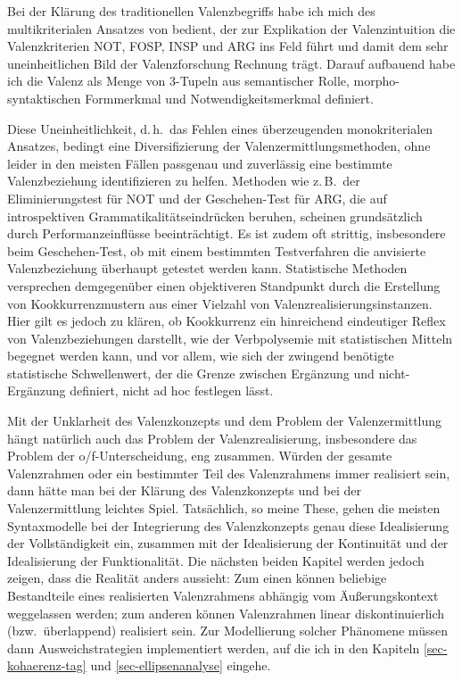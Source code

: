 Bei der Klärung des traditionellen Valenzbegriffs habe ich mich des multikriterialen Ansatzes von \cite{Jacobs:94} bedient, der zur Explikation der Valenzintuition die Valenzkriterien NOT, FOSP, INSP und ARG ins Feld führt und damit dem sehr uneinheitlichen Bild der Valenzforschung Rechnung trägt. Darauf aufbauend habe ich die Valenz als Menge von 3-Tupeln aus semantischer Rolle, morpho-syntaktischen Formmerkmal und Notwendigkeitsmerkmal definiert.  

Diese Uneinheitlichkeit, d.\,h.\ das Fehlen eines überzeugenden monokriterialen Ansatzes, bedingt eine Diversifizierung der Valenzermittlungsmethoden, ohne leider in den meisten Fällen passgenau und zuverlässig eine bestimmte Valenzbeziehung identifizieren zu helfen. Methoden wie z.\,B.\ der Eliminierungstest für NOT und der Geschehen-Test für ARG, die auf introspektiven Grammatikalitätseindrücken beruhen, scheinen grundsätzlich durch Performanzeinflüsse beeinträchtigt. Es ist zudem oft strittig, insbesondere beim Geschehen-Test, ob mit einem bestimmten Testverfahren die anvisierte Valenzbeziehung überhaupt getestet werden kann. Statistische Methoden  versprechen demgegenüber einen objektiveren Standpunkt durch die Erstellung von Kookkurrenzmustern aus einer Vielzahl von Valenzrealisierungsinstanzen. Hier gilt es jedoch zu klären, ob Kookkurrenz ein hinreichend eindeutiger Reflex von Valenzbeziehungen darstellt, wie der Verbpolysemie mit statistischen Mitteln begegnet werden kann, und vor allem, wie sich der zwingend benötigte statistische Schwellenwert, der die Grenze zwischen Ergänzung und nicht-Ergänzung definiert, nicht ad hoc festlegen lässt.

Mit der Unklarheit des Valenzkonzepts und dem Problem der Valenzermittlung hängt natürlich auch das Problem der Valenzrealisierung, insbesondere das Problem der o/f-Unterschei\-dung, eng zusammen. Würden der gesamte Valenzrahmen oder ein bestimmter Teil des Valenzrahmens immer realisiert sein, dann hätte man bei der Klärung des Valenzkonzepts und bei der Valenzermittlung leichtes Spiel. Tatsächlich, so meine These, gehen die meisten Syntaxmodelle bei der Integrierung des Valenzkonzepts genau diese Idealisierung der Vollständigkeit ein, zusammen mit der Idealisierung der Kontinuität und der Idealisierung der Funktionalität. Die nächsten beiden Kapitel werden jedoch zeigen, dass die Realität anders aussieht: Zum einen können beliebige Bestandteile eines realisierten Valenzrahmens abhängig vom Äu\ss erungskontext weggelassen werden; zum anderen können Valenzrahmen linear diskontinuierlich (bzw.\ überlappend) realisiert sein. Zur Modellierung solcher Phänomene müssen dann Ausweichstrategien implementiert werden, auf die ich in den Kapiteln \ref{sec-kohaerenz-tag} und \ref{sec-ellipsenanalyse} eingehe. 

